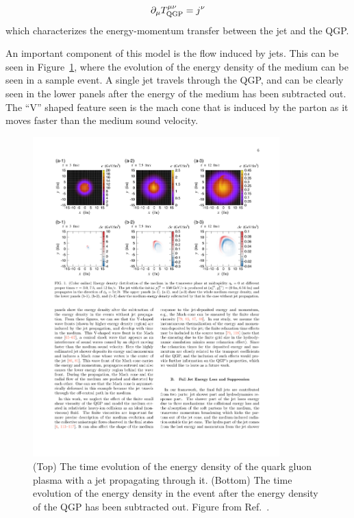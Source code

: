 \begin{align}
 \partial_\mu T_{\rm QGP}^{\mu\nu} = j^\nu
\end{align}
which characterizes the energy-momentum transfer between the jet and the QGP.

An important component of this model is the flow induced by jets.
This can be seen in Figure~\ref{fig:jf_snapshot}, where the evolution of the energy density of the medium can be seen in a sample event.
A single jet travels through the QGP, and can be clearly seen in the lower panels after the energy of the medium has been subtracted out.
The ``V'' shaped feature seen is the mach cone that is induced by the parton as it moves faster than the medium sound velocity.


\begin{figure}[htbp]
\begin{center}
\includegraphics[width=0.85\textwidth]{figures/jetMeasurements/JF_snapshot}
\caption{(Top) The time evolution of the energy density of the quark gluon plasma with a jet propagating through it.
(Bottom) The time evolution of the energy density in the event after the energy density of the QGP has been subtracted out.
Figure from Ref.~\cite{Tachibana:2017syd}.}
\label{fig:jf_snapshot}
\end{center}
\end{figure}

